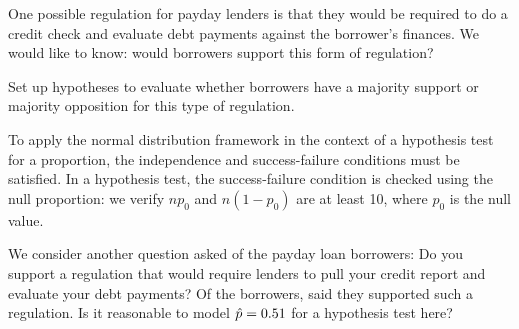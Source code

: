 One possible regulation for payday lenders is that they
would be required to do a credit check and evaluate debt
payments against the borrower's finances.
We would like to know: would borrowers support this form
of regulation?


\begin{exercisewrap}
\begin{nexercise}
\label{paydayCC_hypotheses_gp}%
Set up hypotheses to evaluate whether borrowers
have a majority support or majority opposition for this
type of regulation.\footnotemark
\end{nexercise}
\end{exercisewrap}

To apply the normal distribution framework in the context
of a hypothesis test for a proportion, the independence
and success-failure conditions must be satisfied.
In a hypothesis test, the success-failure condition is
checked using the null proportion:
we verify $np_0$ and $n(1-p_0)$ are at least 10,
where $p_0$ is the null value.

\begin{exercisewrap}
\begin{nexercise}
\label{paydayCC_conditions_gp}%
We consider another question asked
of the payday loan borrowers:
Do you support a regulation that would
require lenders to pull your credit report
and evaluate your debt payments?
Of the \paydayN{} borrowers, \paydayCCPerc{}
said they supported such a regulation.
Is it reasonable to model $\hat{p} = 0.51{}$
for a hypothesis test here?\footnotemark
\end{nexercise}
\end{exercisewrap}
    
